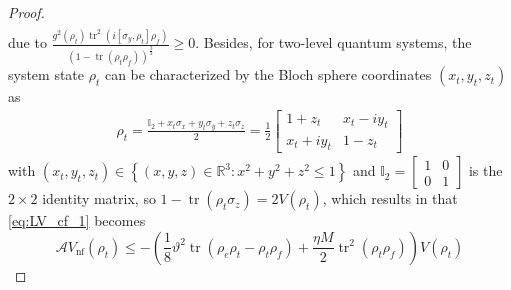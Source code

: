 \documentclass[]{elsarticle}
\begin{document}
\begin{proof}
\begin{equation}
\begin{aligned}
		\end{aligned}
	\end{equation}
	due to $\frac{g^{2}\left(\rho_t\right)\operatorname{tr}^2\left(i\left[\sigma_y, \rho_t\right]\rho_{f}\right)}{\left(1-\operatorname{tr}\left(\rho_t \rho_{f}\right)\right)^{\frac{3}{2}}}\ge0$. Besides, for two-level quantum systems, the system state $\rho_{t}$ can be characterized by the Bloch sphere coordinates $(x_t, y_t, z_t)$ as
	\begin{equation}\label{eq:rho_bloch}
		\begin{aligned}
			\rho_t=\frac{\mathbb{I}_2+x_t \sigma_{x}+y_t \sigma_{y}+z_t \sigma_{z}}{2}
			=\frac{1}{2}\left[\begin{array}{cc}
				1+z_t & x_t-iy_t \\
				x_t+iy_t & 1-z_t
			\end{array}\right]
		\end{aligned}
	\end{equation}
	with $(x_t, y_t, z_t)\in \left\{(x, y, z) \in \mathbb{R}^{3}: x^{2}+y^{2}+z^{2} \leq 1\right\}$ and $\mathbb{I}_2=\left[\begin{array}{cc}
		1 & 0 \\
		0 & 1
	\end{array}\right]$ is the $2\times2$ identity matrix, so
	$1-\operatorname{tr}\left(\rho_{t}\sigma_z\right)=2V\left(\rho_{t}\right)$, which results in that \eqref{eq:LV_cf_1} becomes
	\begin{equation}\label{eq:LV_cf_2}
		\mathcal{A}V_{\mathrm{nf}}\left(\rho_{t}\right)\le-\left(\frac{1}{8}\vartheta^2\operatorname{tr}\left(\rho_{e}\rho_{t}-\rho_t\rho_{f}\right)+\frac{\eta M}{2}\operatorname{tr}^{2}\left(\rho_t \rho_{f}\right)\right)V\left(\rho_{t}\right)
	\end{equation}
	

\end{proof}
\end{document}
